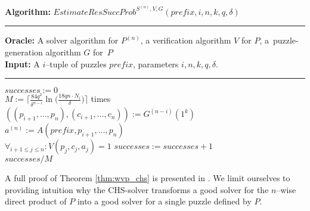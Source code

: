 %
\begin{codeblock}
  \textbf{Algorithm:} $\mathit{EstimateResSuccProb}^{S^{(n)},V, G}(\mathit{prefix}, i, n, k, q, \delta)$
  \medskip \hrule
  \textbf{Oracle:} A solver algorithm for $P^{(n)}$, a verification algorithm $V$ for $P$, a~puzzle-generation algorithm $G$ for~$P$\\
  \textbf{Input:} A $i$--tuple of puzzles $\mathit{prefix}$, parameters $i, n, k, q, \delta$.
  \medskip\hrule
  $successes := 0$ \\
  \Repeat $M := \Big\lceil \frac{84q^2}{\delta^{n-i}} \ln \Big(\frac{18qn \cdot N_i}{\delta} \Big) \Big\rceil$ times \\
  \IndI $((p_{i+1}, \dotsc, p_n), (c_{i+1}, \dotsc, c_n)) := G^{(n-i)}(1^k)$\\
  \IndI $a^{(n)} := A(\mathit{prefix}, p_{i+1}, \dotsc, p_{n})$\\
  \IndI \If $\forall_{i + 1\leq j \leq n} : V(p_j, c_j, a_j) = 1$ \Then $\mathit{successes := successes + 1}$ \\
  \Return $successes / M$
\end{codeblock}
%
A full proof of Theorem \ref{thm:wvp_chs} is presented in \cite{canetti2005hardness}.
We limit ourselves to providing intuition why the CHS-solver transforms a good solver
for the $n$--wise direct product of $P$ into a good solver for a single puzzle defined by $P$.

